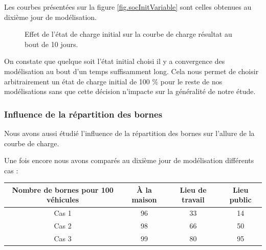 				Les courbes présentées sur la figure \vref{fig.socInitVariable} sont celles obtenues au dixième jour de modélisation.
				
				\begin{figure}[!h]
					\centering
					\caption{Effet de l'état de charge initial sur la courbe de charge résultat au bout de 10 jours. \label{fig.socInitVariable}}
				\end{figure}			
				
				On constate que quelque soit l'état initial choisi il y a convergence des modélisation au bout d'un temps suffisamment long. Cela nous permet de choisir arbitrairement un état de charge initial de 100 \% pour le reste de nos modélisations sans que cette décision n'impacte sur la généralité de notre étude. 
		
				
				\subsubsection{Influence de la répartition des bornes}
				
				Nous avons aussi étudié l'influence de la répartition des bornes sur l'allure de la courbe de charge.
				
				Une fois encore nous avons comparés au dixième jour de modélisation différents cas : 
				\begin{table}[h!]
				\centering
				\begin{tabular}{|c||c|c|c|}
					\hline
					Nombre de bornes pour 100 véhicules & À la maison & Lieu de travail & Lieu public \\
					\hline
					Cas 1 & 96 & 33 & 14 \\
					\hline
					Cas 2 & 98 & 66 & 50\\
					\hline
					Cas 3 & 99 & 80 & 95\\
					\hline
				\end{tabular}
				\end{table}		
				
